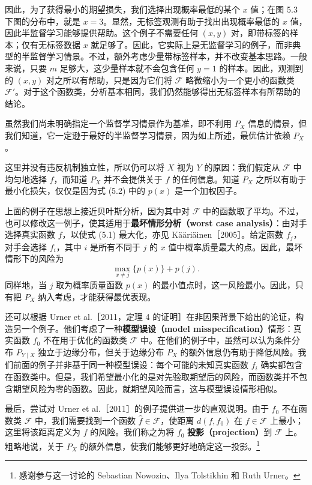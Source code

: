 因此，为了获得最小的期望损失，我们选择出现概率最低的某个 $x$ 值；在图 5.3 下图的分布中，就是 $x=3$。显然，无标签观测有助于找出出现概率最低的 $x$ 值，因此半监督学习能够提供帮助。这个例子不需要任何 $(x,y)$ 对，即带标签的样本；仅有无标签数据 $x$ 就足够了。因此，它实际上是无监督学习的例子，而非典型的半监督学习情景。不过，额外考虑少量带标签样本，并不改变基本思路。一般来说，只要 $m$ 足够大，这少量样本就不会包含任何 $y=1$ 的样本。因此，观测到的 $(x,y)$ 对之所以有帮助，只是因为它们将 $\mathcal{F}$ 略微缩小为一个更小的函数类 $\mathcal{F}'$。对于这个函数类，分析基本相同，我们仍然能够得出无标签样本有所帮助的结论。

虽然我们尚未明确指定一个监督学习情景作为基准，即不利用 $P_X$ 信息的情景，但我们知道，它一定逊于最好的半监督学习情景，因为如上所述，最优估计依赖 $P_X$。

这里并没有违反机制独立性，所以仍可以将 $X$ 视为 $Y$ 的原因：我们假定从 $\mathcal{F}$ 中均匀地选择 $f$，而知道 $P_X$ 并不会提供关于 $f$ 的任何信息。知道 $P_X$ 之所以有助于最小化损失，仅仅是因为式 (5.2) 中的 $p(x)$ 是一个加权因子。

上面的例子在思想上接近贝叶斯分析，因为其中对 $\mathcal{F}$ 中的函数取了平均。不过，也可以修改这一例子，使其适用于\textbf{最坏情形分析（worst case analysis）}：由对手选择真实函数 $f$，以使式 (5.1) 最大化，亦见 Kääriäinen［2005］。给定函数 $f_j$，对手会选择 $f_i$，其中 $i$ 是所有不同于 $j$ 的 $x$ 值中概率质量最大的点。因此，最坏情形下的风险为
\[
 \max_{x\neq j}\{p(x)\}+p(j).
\]
同样地，当 $j$ 取为概率质量函数 $p(x)$ 的最小值点时，这一风险最小。因此，只有把 $P_X$ 纳入考虑，才能获得最优表现。

还可以根据 Urner et al.［2011，定理 4 的证明］在非因果背景下给出的论证，构造另一个例子。他们考虑了一种\textbf{模型误设（model misspecification）}情形：真实函数 $f_0$ 不在用于优化的函数类 $\mathcal{F}$ 中。在他们的例子中，虽然可以认为条件分布 $P_{Y\mid X}$ 独立于边缘分布，但关于边缘分布 $P_X$ 的额外信息仍有助于降低风险。我们前面的例子并非基于同一种模型误设：每个可能的未知真实函数 $f_i$ 确实都包含在函数类中。但是，我们希望最小化的是对先验取期望后的风险，而函数类并不包含期望风险为零的函数。因此，就期望风险而言，这与模型误设情形相似。

最后，尝试对 Urner et al.［2011］的例子提供进一步的直观说明。由于 $f_0$ 不在函数类 $\mathcal{F}$ 中，我们需要找到一个函数 $\hat f\in\mathcal{F}$，使距离 $d(f,f_0)$ 在 $f\in\mathcal{F}$ 上最小；这里将该距离定义为 $f$ 的风险。我们称之为将 $f_0$ \textbf{投影（projection）}到 $\mathcal{F}$ 上。粗略地说，关于 $P_X$ 的额外信息，使我们能够更好地确定这一投影。\footnote{感谢参与这一讨论的 Sebastian Nowozin、Ilya Tolstikhin 和 Ruth Urner。}
\FloatBarrier

